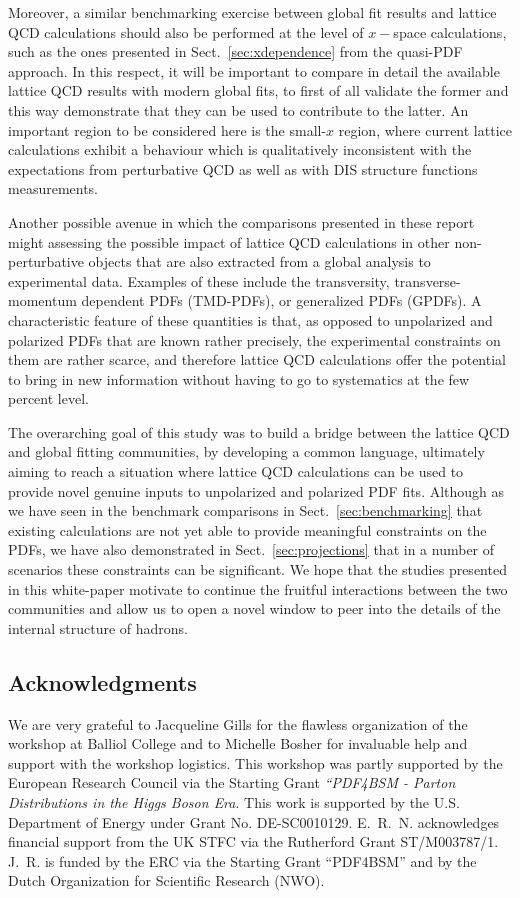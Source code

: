 Moreover, a similar benchmarking exercise between global fit results and lattice
QCD calculations should also be performed at the level of
$x-$space calculations, such as the ones presented in Sect.~\ref{sec:xdependence}
from the quasi-PDF approach.
%
In this respect, it will be important to compare in detail the available lattice
QCD results with modern global fits, to first of all validate the former and
this way demonstrate that they can be used to contribute to the latter.
%
An important region to be considered here is the small-$x$ region, where current lattice
calculations exhibit a behaviour which is qualitatively inconsistent with
the expectations from perturbative QCD as well as with DIS structure functions measurements.

Another possible avenue in which the comparisons presented in these report might assessing
the possible impact of lattice QCD calculations in other non-perturbative objects that
are also extracted from a global analysis to experimental data.
%
Examples of these include the transversity, transverse-momentum dependent PDFs (TMD-PDFs),
or generalized PDFs (GPDFs).
%
A characteristic feature of these quantities is that, as opposed to unpolarized and
polarized PDFs that are known rather precisely, the experimental constraints on them
are rather scarce, and therefore lattice QCD calculations offer the potential
to bring in new information without having to go to systematics at the few percent level.

The overarching goal of this study was to build a bridge between the lattice QCD
and global fitting communities, by developing a common language, ultimately
aiming to reach a situation where
lattice QCD calculations can be used to provide novel genuine inputs
to unpolarized and polarized PDF fits.
%
Although as we have seen in the benchmark comparisons in Sect.~\ref{sec:benchmarking} that
existing calculations are not yet able to provide meaningful constraints on the
PDFs, we have also demonstrated in Sect.~\ref{sec:projections} that in a number
of scenarios these constraints can be significant.
%
We hope that the studies presented in this white-paper motivate to continue the fruitful
interactions between the two communities and allow us to open a novel window
to peer into the details of the internal structure of hadrons.


\subsection*{Acknowledgments}

We are very grateful to Jacqueline Gills for the flawless organization
of the workshop at Balliol College and to Michelle Bosher for
invaluable help and support with the workshop logistics.
%
This workshop was partly supported by the European Research Council via
the Starting Grant {\it ``PDF4BSM - Parton Distributions in the
  Higgs Boson Era}.
%
This work is supported by
the U.S. Department of Energy under Grant No. DE-SC0010129.
%
E.~R.~N. acknowledges financial support from the
UK STFC via the Rutherford Grant ST/M003787/1.
%
J.~R. is funded by the ERC via the Starting Grant ``PDF4BSM'' and by the
Dutch Organization for Scientific Research (NWO).
